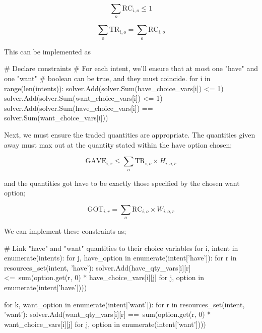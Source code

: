 \begin{equation}
    \sum_o \text{RC}_{i, o} \leq 1
\end{equation}

\begin{equation}
    \sum_o \text{TR}_{i, o} = \sum_o \text{RC}_{i, o}
\end{equation}

This can be implemented as

\begin{betterpython}
# Declare constraints
# For each intent, we'll ensure that at most one "have" and one "want"
# boolean can be true, and they must coincide.
for i in range(len(intents)):
    solver.Add(solver.Sum(have_choice_vars[i]) <= 1)
    solver.Add(solver.Sum(want_choice_vars[i]) <= 1)
    solver.Add(solver.Sum(have_choice_vars[i]) == solver.Sum(want_choice_vars[i]))
\end{betterpython}

Next, we must ensure the traded quantities are appropriate. The quantities given away must max out at the quantity stated within the have option chosen;

\begin{equation}
    \text{GAVE}_{i, r} \leq \sum_{o} \text{TR}_{i, o} \times H_{i, o, r}
\end{equation}

and the quantities got have to be exactly those specified by the chosen want option;

\begin{equation}
    \text{GOT}_{i, r} = \sum_{o} \text{RC}_{i, o} \times W_{i, o, r}
\end{equation}

We can implement these constraints as;

\begin{betterpython}
# Link "have" and "want" quantities to their choice variables
for i, intent in enumerate(intents):
    for j, have_option in enumerate(intent['have']):
        for r in resources_set(intent, 'have'):
            solver.Add(have_qty_vars[i][r] <=\
                sum(option.get(r, 0) * have_choice_vars[i][j]
                    for j, option in enumerate(intent['have'])))
    
    for k, want_option in enumerate(intent['want']):
        for r in resources_set(intent, 'want'):
            solver.Add(want_qty_vars[i][r] ==\
                sum(option.get(r, 0) * want_choice_vars[i][j] 
                    for j, option in enumerate(intent['want'])))
\end{betterpython}

